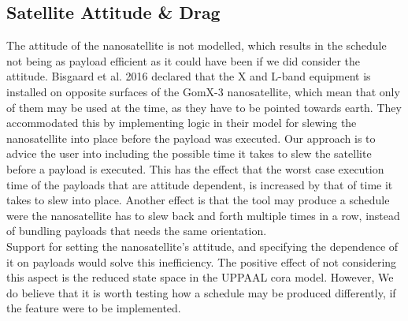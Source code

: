 \subsection{Satellite Attitude \& Drag}
The attitude of the nanosatellite is not modelled, which results in the schedule not being as payload efficient as it could have been if we did consider the attitude. Bisgaard et al. 2016\cite{gomx3} declared that the X and L-band equipment is installed on opposite surfaces of the GomX-3 nanosatellite, which mean that only of them may be used at the time, as they have to be pointed towards earth. They accommodated this by implementing logic in their model for slewing the nanosatellite into place before the payload was executed. Our approach is to advice the user into including the possible time it takes to slew the satellite before a payload is executed. This has the effect that the worst case execution time of the payloads that are attitude dependent, is increased by that of time it takes to slew into place. Another effect is that the tool may produce a schedule were the nanosatellite has to slew back and forth multiple times in a row, instead of bundling payloads that needs the same orientation.\\
Support for setting the nanosatellite's attitude, and specifying the dependence of it on payloads would solve this inefficiency.
The positive effect of not considering this aspect is the reduced state space in the UPPAAL \gls{cora} model. However, We do believe that it is worth testing how a schedule may be produced differently, if the feature were to be implemented.

